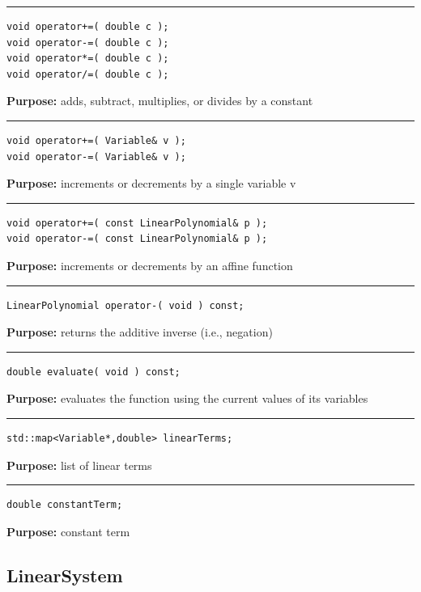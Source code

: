 \documentclass{article}
\begin{document}
\hspace{-.21in}\rule{5in}{1pt}
\begin{verbatim}
void operator+=( double c );
void operator-=( double c );
void operator*=( double c );
void operator/=( double c );
\end{verbatim}
\textbf{Purpose:}
adds, subtract, multiplies, or divides by a constant

\hspace{-.21in}\rule{5in}{1pt}
\begin{verbatim}
void operator+=( Variable& v );
void operator-=( Variable& v );
\end{verbatim}
\textbf{Purpose:}
increments or decrements by a single variable v

\hspace{-.21in}\rule{5in}{1pt}
\begin{verbatim}
void operator+=( const LinearPolynomial& p );
void operator-=( const LinearPolynomial& p );
\end{verbatim}
\textbf{Purpose:}
increments or decrements by an affine function

\hspace{-.21in}\rule{5in}{1pt}
\begin{verbatim}
LinearPolynomial operator-( void ) const;
\end{verbatim}
\textbf{Purpose:}
returns the additive inverse (i.e., negation)

\hspace{-.21in}\rule{5in}{1pt}
\begin{verbatim}
double evaluate( void ) const;
\end{verbatim}
\textbf{Purpose:}
evaluates the function using the current values of its variables

\hspace{-.21in}\rule{5in}{1pt}
\begin{verbatim}
std::map<Variable*,double> linearTerms;
\end{verbatim}
\textbf{Purpose:}
list of linear terms

\hspace{-.21in}\rule{5in}{1pt}
\begin{verbatim}
double constantTerm;
\end{verbatim}
\textbf{Purpose:}
constant term
\pagebreak\subsection{LinearSystem}

 
\end{document}
